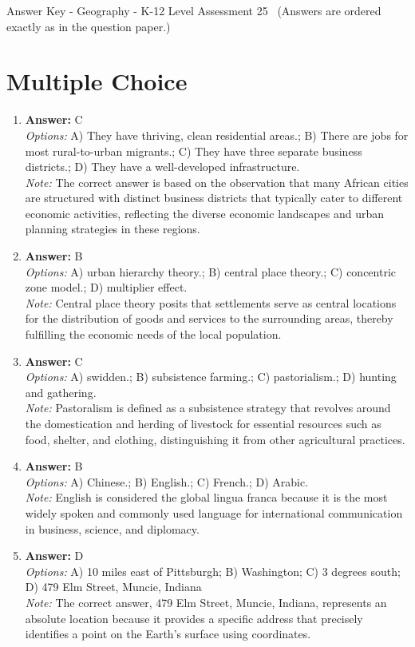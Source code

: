 \documentclass[12pt]{article}
\begin{document}
\begin{center}
Answer Key - Geography - K-12 Level Assessment 25 \
\small (Answers are ordered exactly as in the question paper.)
\end{center}

\section*{Multiple Choice}
\begin{enumerate}[label=\arabic*.]
\item \textbf{Answer:} C
\\ \textit{Options:} A) They have thriving, clean residential areas.; B) There are jobs for most rural-to-urban migrants.; C) They have three separate business districts.; D) They have a well-developed infrastructure.
\\ \textit{Note:} The correct answer is based on the observation that many African cities are structured with distinct business districts that typically cater to different economic activities, reflecting the diverse economic landscapes and urban planning strategies in these regions.
\item \textbf{Answer:} B
\\ \textit{Options:} A) urban hierarchy theory.; B) central place theory.; C) concentric zone model.; D) multiplier effect.
\\ \textit{Note:} Central place theory posits that settlements serve as central locations for the distribution of goods and services to the surrounding areas, thereby fulfilling the economic needs of the local population.
\item \textbf{Answer:} C
\\ \textit{Options:} A) swidden.; B) subsistence farming.; C) pastorialism.; D) hunting and gathering.
\\ \textit{Note:} Pastoralism is defined as a subsistence strategy that revolves around the domestication and herding of livestock for essential resources such as food, shelter, and clothing, distinguishing it from other agricultural practices.
\item \textbf{Answer:} B
\\ \textit{Options:} A) Chinese.; B) English.; C) French.; D) Arabic.
\\ \textit{Note:} English is considered the global lingua franca because it is the most widely spoken and commonly used language for international communication in business, science, and diplomacy.
\item \textbf{Answer:} D
\\ \textit{Options:} A) 10 miles east of Pittsburgh; B) Washington; C) 3 degrees south; D) 479 Elm Street, Muncie, Indiana
\\ \textit{Note:} The correct answer, 479 Elm Street, Muncie, Indiana, represents an absolute location because it provides a specific address that precisely identifies a point on the Earth's surface using coordinates.
\end{enumerate}
\end{document}
